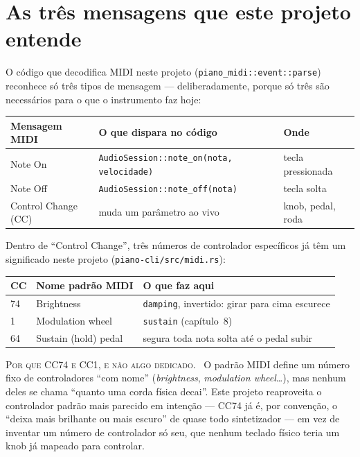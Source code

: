\documentclass[11pt,oneside]{book}
\newcommand{\nova}[1]{\textsc{\color{accent}#1.}~}
\begin{document}
\section*{As três mensagens que este projeto entende}

O código que decodifica MIDI neste projeto
(\texttt{piano\_midi::event::parse}) reconhece só três tipos de mensagem
--- deliberadamente, porque só três são necessários para o que o
instrumento faz hoje:

\begin{center}
\begin{tabularx}{\linewidth}{p{3.0cm}Xp{2.6cm}}
\toprule
Mensagem MIDI & O que dispara no código & Onde \\
\midrule
Note On & \texttt{AudioSession::note\_on(nota, velocidade)} & tecla pressionada \\
Note Off & \texttt{AudioSession::note\_off(nota)} & tecla solta \\
Control Change (CC) & muda um parâmetro ao vivo & knob, pedal, roda \\
\bottomrule
\end{tabularx}
\end{center}

Dentro de \enquote{Control Change}, três números de controlador
específicos já têm um significado neste projeto
(\texttt{piano-cli/src/midi.rs}):

\begin{center}
\begin{tabular}{lll}
\toprule
CC & Nome padrão MIDI & O que faz aqui \\
\midrule
74 & Brightness & \texttt{damping}, invertido: girar para cima escurece \\
1 & Modulation wheel & \texttt{sustain} (capítulo~8) \\
64 & Sustain (hold) pedal & segura toda nota solta até o pedal subir \\
\bottomrule
\end{tabular}
\end{center}

\begin{newword}
\nova{Por que CC74 e CC1, e não algo dedicado} O padrão MIDI define um
número fixo de controladores \enquote{com nome} (\emph{brightness},
\emph{modulation wheel}\ldots), mas nenhum deles se chama \enquote{quanto
uma corda física decai}. Este projeto reaproveita o controlador padrão
mais parecido em intenção --- CC74 já é, por convenção, o \enquote{deixa
mais brilhante ou mais escuro} de quase todo sintetizador --- em vez de
inventar um número de controlador só seu, que nenhum teclado físico teria
um knob já mapeado para controlar.
\end{newword}
\end{document}
